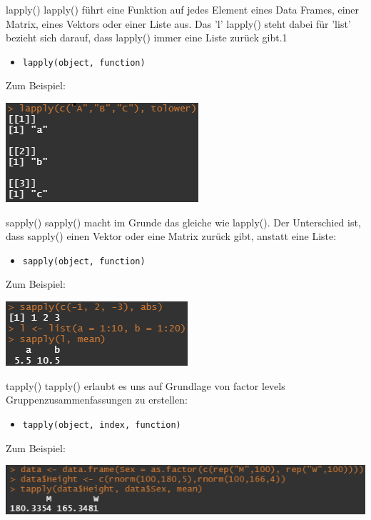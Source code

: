 \documentclass[aspectratio = 169]{chariteBeamer}
\begin{document}
\begin{frame}[fragile]{lapply()}
	lapply() führt eine Funktion auf jedes Element eines Data Frames, einer Matrix, eines Vektors oder einer Liste aus. Das 'l'  lapply() steht dabei für 'list'  bezieht sich darauf, dass lapply() immer eine Liste zurück gibt.1
	\begin{itemize}
		\item \verb+lapply(object, function)+
	\end{itemize}
	Zum Beispiel:\\
	\begin{center}
		\includegraphics{lapply}
	\end{center}
	
	
\end{frame}

\begin{frame}[fragile]{sapply()}
	sapply() macht im Grunde das gleiche wie lapply(). Der Unterschied ist, dass sapply() einen Vektor oder eine Matrix zurück gibt, anstatt eine Liste:
	\begin{itemize}
		\item \verb+sapply(object, function)+
	\end{itemize}
	Zum Beispiel:\\
	\begin{center}
		\includegraphics{sapply}
	\end{center}
\end{frame}

\begin{frame}[fragile]{tapply()}
	tapply() erlaubt es uns auf Grundlage von factor levels Gruppenzusammenfassungen zu erstellen:
	\begin{itemize}
		\item \verb+tapply(object, index, function)+
	\end{itemize}
	Zum Beispiel:\\
	\begin{center}
		\includegraphics{tapply}
	\end{center}
\end{frame}
\end{document}
